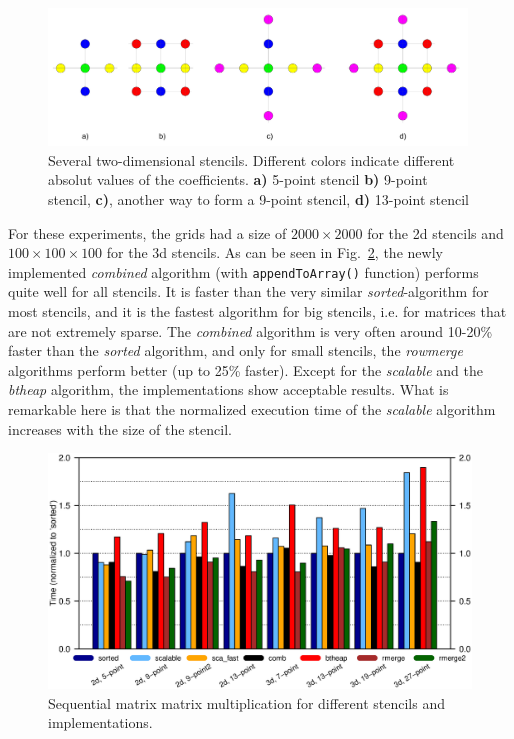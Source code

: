 \begin{figure}[tb]
	\centering
	\includegraphics[width=0.99\textwidth, trim={0 0.cm 0 0cm},clip]{stencils}
	\caption{Several two-dimensional stencils. Different colors indicate different absolut values of the coefficients. \textbf{a)} 5-point stencil \textbf{b)} 9-point stencil, \textbf{c)}, another way to form a 9-point stencil, \textbf{d)} 13-point stencil} 
	\label{fig:stencils}
\end{figure}


For these experiments, the grids had a size of $2000 \times 2000$ for the 2d stencils and $100\times 100 \times 100$ for the 3d stencils. As can be seen in Fig.~\ref{fig:ex209_R}, the newly implemented \textit{combined} algorithm (with \texttt{appendToArray()} function) performs quite well for all stencils. It is faster than the very similar \textit{sorted}-algorithm for most stencils, and it is the fastest algorithm for big stencils, i.e. for matrices that are not extremely sparse. The \textit{combined} algorithm is very often around 10-20\% faster than the \textit{sorted} algorithm, and only for small stencils, the \textit{rowmerge} algorithms perform better (up to 25\% faster). Except for the \textit{scalable} and the \textit{btheap} algorithm, the implementations show acceptable results. What is remarkable here is that the normalized execution time of the \textit{scalable} algorithm increases with the size of the stencil.

\begin{figure}[tb]
	\centering
	\hspace*{-10mm}\includegraphics[width=1.1\textwidth, trim={0 7.cm 0 1.6cm},clip]{petsc-matmatmult}
	\caption{Sequential matrix matrix multiplication for different stencils and implementations.  } 
	\label{fig:ex209_R}
\end{figure}

